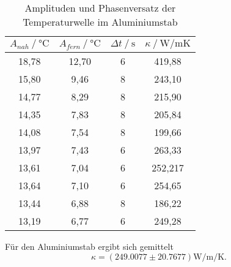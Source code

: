 \begin{table}[H]   
  \centering
  \caption{Amplituden und Phasenversatz der Temperaturwelle im Aluminiumstab}
  \begin{tabular}{cccc}
    \toprule
    {$A_{nah} \mathbin{/} \unit{\degreeCelsius}$} &
    {$A_{fern} \mathbin{/} \unit{\degreeCelsius}$} &    %
    {$\Delta t \mathbin{/} \unit{\second}$} &
    {$\kappa \mathbin{/} \unit{\watt / \meter\kelvin}$} \\
    \midrule
    18,78 & 12,70 & 6 & 419,88 \\
    15,80 &  9,46 & 8 & 243,10 \\
    14,77 &  8,29 & 8 & 215,90 \\   
    14,35 &  7,83 & 8 & 205,84 \\
    14,08 &  7,54 & 8 & 199,66 \\
    13,97 &  7,43 & 6 & 263,33 \\
    13,61 &  7,04 & 6 & 252,217 \\
    13,64 &  7,10 & 6 & 254,65 \\
    13,44 &  6,88 & 8 & 186,22 \\
    13,19 &  6,77 & 6 & 249,28 \\
    
    \bottomrule
  \end{tabular}
  \label{tab:TabelleA4}
\end{table}

\noindent Für den Aluminiumstab ergibt sich gemittelt
\begin{equation*}
  \kappa = (249.0077 \pm 20.7677)\unit{\watt\per\meter\per\kelvin}.
\end{equation*}
